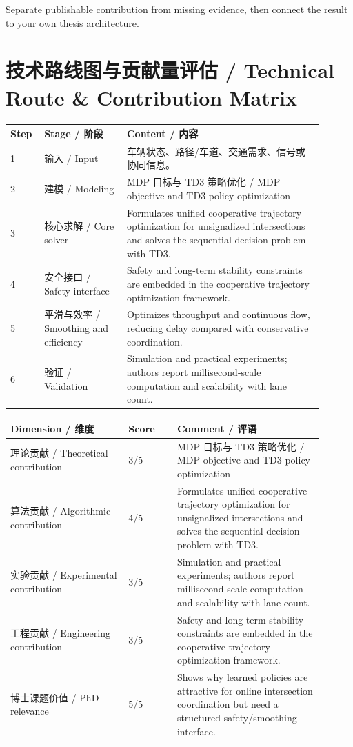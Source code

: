 \documentclass[UTF8,a4paper,11pt,fontset=fandol]{ctexart}
\begin{document}
Separate publishable contribution from missing evidence, then connect the result to your own thesis architecture.


\section{技术路线图与贡献量评估 / Technical Route \& Contribution Matrix}
\begin{longtable}{p{0.08\linewidth}p{0.24\linewidth}p{0.58\linewidth}}
\toprule
Step & Stage / 阶段 & Content / 内容\\
\midrule
1 & 输入 / Input & 车辆状态、路径/车道、交通需求、信号或协同信息。 \\
2 & 建模 / Modeling & MDP 目标与 TD3 策略优化 / MDP objective and TD3 policy optimization \\
3 & 核心求解 / Core solver & Formulates unified cooperative trajectory optimization for unsignalized intersections and solves the sequential decision problem with TD3. \\
4 & 安全接口 / Safety interface & Safety and long-term stability constraints are embedded in the cooperative trajectory optimization framework. \\
5 & 平滑与效率 / Smoothing and efficiency & Optimizes throughput and continuous flow, reducing delay compared with conservative coordination. \\
6 & 验证 / Validation & Simulation and practical experiments; authors report millisecond-scale computation and scalability with lane count. \\
\bottomrule
\end{longtable}

\begin{longtable}{p{0.34\linewidth}p{0.14\linewidth}p{0.42\linewidth}}
\toprule
Dimension / 维度 & Score & Comment / 评语\\
\midrule
理论贡献 / Theoretical contribution & 3/5 & MDP 目标与 TD3 策略优化 / MDP objective and TD3 policy optimization \\
算法贡献 / Algorithmic contribution & 4/5 & Formulates unified cooperative trajectory optimization for unsignalized intersections and solves the sequential decision problem with TD3. \\
实验贡献 / Experimental contribution & 3/5 & Simulation and practical experiments; authors report millisecond-scale computation and scalability with lane count. \\
工程贡献 / Engineering contribution & 3/5 & Safety and long-term stability constraints are embedded in the cooperative trajectory optimization framework. \\
博士课题价值 / PhD relevance & 5/5 & Shows why learned policies are attractive for online intersection coordination but need a structured safety/smoothing interface. \\
\bottomrule
\end{longtable}
\end{document}
